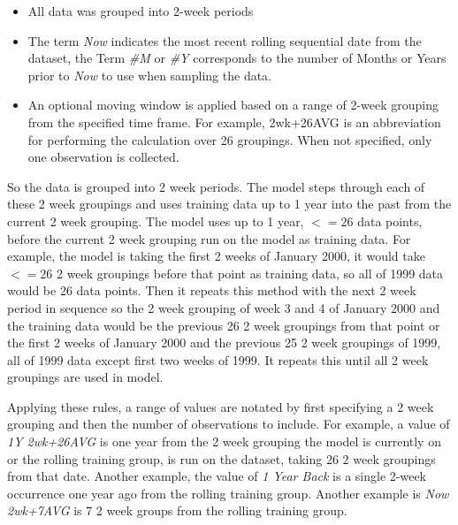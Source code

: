 \documentclass[utf8]{FrontiersinVancouver} %
\begin{document}
\begin{itemize}
  \item All data was grouped into 2-week periods
  \item The term {\em Now} indicates the most recent rolling sequential date from the dataset,
        the Term {\em \#M} or {\em \#Y} corresponds to the number of Months or Years
        prior to {\em Now} to use when sampling the data. 
  \item An optional moving window is applied based on a range of 2-week grouping
        from the specified time frame.  For example, 2wk+26AVG is an abbreviation
        for performing the calculation over 26 groupings.
        When not specified, only one observation is collected.
\end{itemize}

So the data is grouped into 2 week periods. The model steps through
each of these 2 week groupings and uses training data up to 1 year
into the past from the current 2 week grouping. The model uses up 
to 1 year, $<=26$ data points, before the current 2 week grouping 
run on the model as training data. For example, the model is taking 
the first 2 weeks of January 2000, it would take $<=26$ 2 week groupings 
before that point as training data, so all of 1999 data would be 26 
data points. Then it repeats this method with the next 2 week period 
in sequence so the 2 week grouping of week 3 and 4 of January 2000 
and the training data would be the previous 26 2 week groupings from 
that point or the first 2 weeks of January 2000 and the previous 25 
2 week groupings of 1999, all of 1999 data except first two weeks of 
1999. It repeats this until all 2 week groupings are used in model.

Applying these rules, a range of values are notated by first specifying a 2 week grouping
and then the number of observations to include.  For example, a value of {\em 1Y 2wk+26AVG} 
is one year from the 2 week grouping the model is currently on or the rolling training group,
is run on the dataset, taking 26 2 week groupings from that date. Another example, the value 
of {\em 1 Year Back} is a single 2-week occurrence one year ago from the rolling training group.
Another example is {\em Now 2wk+7AVG} is 7 2 week groups from the rolling training group.
\end{document}
